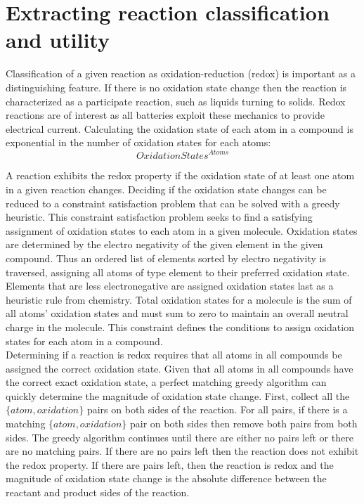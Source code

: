 \documentclass{article}
\begin{document}
\section{Extracting reaction classification and utility}
Classification of a given reaction as oxidation-reduction (redox) is important as a distinguishing feature. If there is no oxidation state change then the reaction is characterized as a participate reaction, such as liquids turning to solids.  Redox reactions are of interest as all batteries exploit these mechanics to provide electrical current. Calculating the oxidation state of each atom in a compound is exponential in the number of oxidation states for each atoms: $${OxidationStates}^{Atoms}$$ 

A reaction exhibits the redox property if the oxidation state of at least one atom in a given reaction changes. Deciding if the oxidation state changes can be reduced to a constraint satisfaction problem that can be solved with a greedy heuristic. This constraint satisfaction problem seeks to find a satisfying assignment of oxidation states to each atom in a given molecule. Oxidation states are determined by the electro negativity of the given element in the given compound. Thus an ordered list of elements sorted by electro negativity is traversed, assigning all atoms of type element to their preferred oxidation state. Elements that are less electronegative are assigned oxidation states last as a heuristic rule from chemistry. Total oxidation states for a molecule is the sum of all atoms' oxidation states and must sum to zero to maintain an overall neutral charge in the molecule. This constraint defines the conditions to assign oxidation states for each atom in a compound.\\

Determining if a reaction is redox requires that all atoms in all compounds be assigned the correct oxidation state. Given that all atoms in all compounds have the correct exact oxidation state, a perfect matching greedy algorithm can quickly determine the magnitude of oxidation state change. First, collect all the $\{atom,oxidation\}$ pairs on both sides of the reaction. For all pairs, if there is a matching $\{atom,oxidation\}$ pair on both sides then remove both pairs from both sides. The greedy algorithm continues until there are either no pairs left or there are no matching pairs. If there are no pairs left then the reaction does not exhibit the redox property. If there are pairs left, then the reaction is redox and the magnitude of oxidation state change is the absolute difference between the reactant and product sides of the reaction. \\
\end{document}

